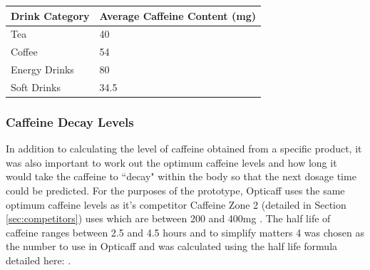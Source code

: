 \begin{center}
\begin{tabular}{|l|l|}
\hline
\textbf{Drink Category} & \textbf{Average Caffeine Content (mg)} \\\hline
Tea & 40 \\\hline
Coffee & 54 \\\hline
Energy Drinks & 80 \\\hline
Soft Drinks & 34.5 \\\hline
\end{tabular}
\end{center}

\subsubsection{Caffeine Decay Levels}
In addition to calculating the level of caffeine obtained from a specific product, it was also important to work out the optimum caffeine levels and how long it would take the caffeine to ``decay" within the body so that the next dosage time could be predicted. For the purposes of the prototype, Opticaff uses the same optimum caffeine levels as it's competitor Caffeine Zone 2 (detailed in Section \ref{sec:competitors}) uses which are between 200 and 400mg \cite{CaffeineZoneInfo}. The half life of caffeine ranges between 2.5 and 4.5 hours \cite{CaffeinePharmacology} \cite{CaffeinePharmacy} and to simplify matters 4 was chosen as the number to use in Opticaff and was calculated using the half life formula detailed here: \cite{HalfLife}.
 
